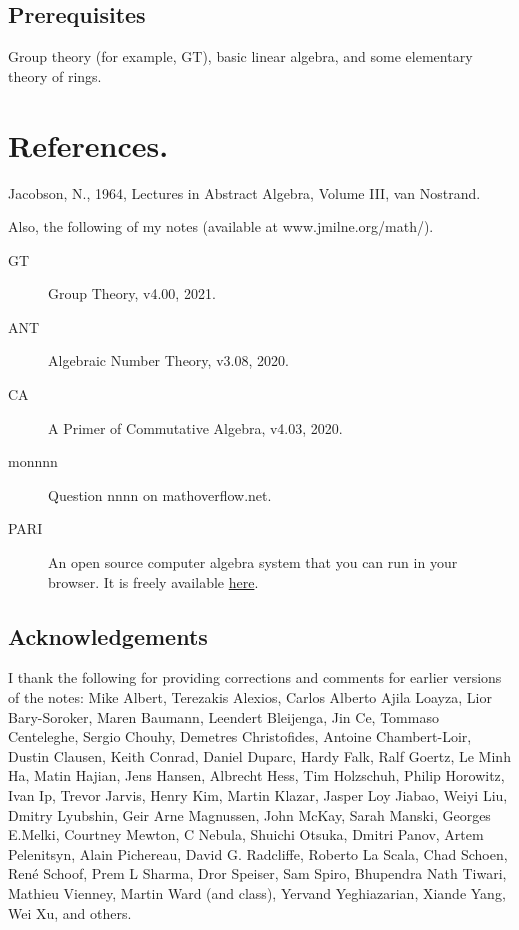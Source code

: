 \documentclass[a4paper,11pt,final,openany]{memoir}
\theoremstyle{nonumberplain}
\begin{document}
\subsection{Prerequisites}

Group theory (for example, GT), basic linear algebra, and some elementary
theory of rings.

\section{References.}

\noindent Jacobson, N., 1964, Lectures in Abstract Algebra, Volume III, van Nostrand.

\noindent Also, the following of my notes (available at www.jmilne.org/math/).

\begin{description}
\item[GT] Group Theory, v4.00, 2021.

\item[ANT] Algebraic Number Theory, v3.08, 2020.

\item[CA] A Primer of Commutative Algebra, v4.03, 2020.

\item[monnnn] Question nnnn on mathoverflow.net.

\item[PARI] An open source computer algebra system that you can run in your
browser. It is freely available \href{http://pari.math.u-bordeaux.fr/}{here}.
\end{description}

\subsection{Acknowledgements}

I thank the following for providing corrections and comments for earlier
versions of the notes: Mike Albert, Terezakis Alexios, Carlos Alberto Ajila Loayza, Lior Bary-Soroker,
Maren Baumann, Leendert Bleijenga, Jin Ce, Tommaso Centeleghe, Sergio Chouhy,
Demetres Christofides, Antoine Chambert-Loir, Dustin Clausen, Keith Conrad,
Daniel Duparc, Hardy Falk, Ralf Goertz, Le Minh Ha, Matin Hajian, Jens Hansen, Albrecht Hess, Tim
Holzschuh, Philip Horowitz, Ivan Ip, Trevor Jarvis, Henry Kim, Martin Klazar,
Jasper Loy Jiabao, Weiyi Liu, Dmitry Lyubshin, Geir Arne Magnussen, John
McKay, Sarah Manski, Georges E.\thinspace Melki, Courtney Mewton, C Nebula,
Shuichi Otsuka, Dmitri Panov, Artem Pelenitsyn, Alain Pichereau, David G.
Radcliffe, Roberto La Scala, Chad Schoen, Ren\'{e} Schoof, Prem L Sharma, Dror
Speiser, Sam Spiro, Bhupendra Nath Tiwari, Mathieu Vienney, Martin Ward (and
class), Yervand Yeghiazarian, Xiande Yang, Wei Xu, and others.
\end{document}
